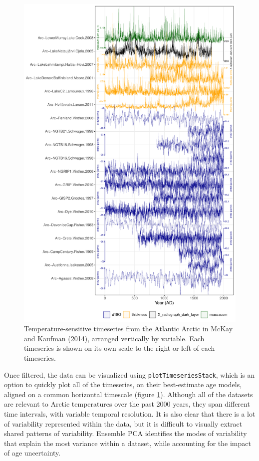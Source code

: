 \documentclass[gchron, manuscript]{copernicus}
\begin{document}
\begin{figure}
\includegraphics[width=12cm]{geoChronR-paper_files/figure-latex/timeseries-stack-1} \caption{Temperature-sensitive timeseries from the Atlantic Arctic in McKay and Kaufman (2014), arranged vertically by variable. Each timeseries is shown on its own scale to the right or left of each timeseries.}\label{fig:timeseries-stack}
\end{figure}

Once filtered, the data can be visualized using \texttt{plotTimeseriesStack}, which is an option to quickly plot all of the timeseries, on their best-estimate age models, aligned on a common horizontal timescale (figure \ref{fig:timeseries-stack}). Although all of the datasets are relevant to Arctic temperatures over the past 2000 years, they span different time intervals, with variable temporal resolution. It is also clear that there is a lot of variability represented within the data, but it is difficult to visually extract shared patterns of variability.
Ensemble PCA identifies the modes of variability that explain the most variance within a dataset, while accounting for the impact of age uncertainty.
\end{document}
